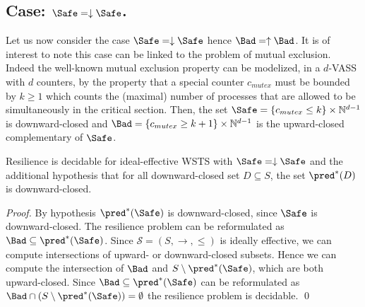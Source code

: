 

\subsection{Case: $\Safe=\downarrow \Safe$.}
%
%

Let us now consider the case $\Safe=\downarrow \Safe$ hence $\Bad=\uparrow \Bad$.
It is of interest to note this case can be linked to the problem of mutual exclusion.
Indeed the well-known mutual exclusion property can be modelized, in a $d$-VASS with $d$ counters, by the property that a special counter $c_{mutex}$ must be bounded by $k \geq 1$ which counts the (maximal) number of processes that are allowed to be simultaneously in the critical section. Then, the set $\Safe =  \{c_{mutex} \leq k\} \times \mathbb{N}^{d-1}$ is downward-closed		and $\Bad =\{c_{mutex} \geq k+1\} \times  \mathbb{N}^{d-1} $ is the upward-closed complementary of $\Safe$. 




%
\begin{theorem}\label{up-down}
{\sc Resilience}  is decidable for ideal-effective WSTS with 
$\Safe=\downarrow \Safe$
and
the additional hypothesis that
for all downward-closed set $D \subseteq S$, the set $\pred^*(D)$ is downward-closed.
\end{theorem}

\begin{proof}
By hypothesis $\pred^*(\Safe)$ is downward-closed, since $\Safe$ is downward-closed.
The resilience problem can be reformulated as 
$\Bad \subseteq  \pred^*(\Safe)$.
Since $\mathscr{S}=(S,\rightarrow, \leq)$ is ideally effective, we can compute intersections of upward- or downward-closed 
 subsets.
Hence we can compute the intersection of
$\Bad$
and
$S \setminus \pred^*(\Safe)$,
which are both upward-closed.
Since
$\Bad \subseteq \pred^*(\Safe)$
can be reformulated as
$\Bad \cap (S \setminus \pred^*(\Safe)) = \emptyset$
the resilience problem is decidable. \qed
\end{proof}

